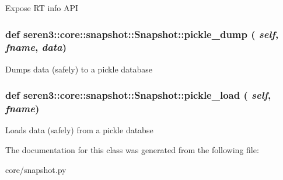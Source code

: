 \begin{DoxyVerb}
Expose RT info API
\end{DoxyVerb}
 \hypertarget{classseren3_1_1core_1_1snapshot_1_1Snapshot_a96b46c9c409bc85e6b6a9ba7fb1afb9b}{
\subsubsection[{pickle\_\-dump}]{\setlength{\rightskip}{0pt plus 5cm}def seren3::core::snapshot::Snapshot::pickle\_\-dump ( {\em self}, \/   {\em fname}, \/   {\em data})}}
\label{classseren3_1_1core_1_1snapshot_1_1Snapshot_a96b46c9c409bc85e6b6a9ba7fb1afb9b}
\begin{DoxyVerb}
Dumps data (safely) to a pickle database
\end{DoxyVerb}
 \hypertarget{classseren3_1_1core_1_1snapshot_1_1Snapshot_a50a31610499721188b20bdc07f35fdd9}{
\subsubsection[{pickle\_\-load}]{\setlength{\rightskip}{0pt plus 5cm}def seren3::core::snapshot::Snapshot::pickle\_\-load ( {\em self}, \/   {\em fname})}}
\label{classseren3_1_1core_1_1snapshot_1_1Snapshot_a50a31610499721188b20bdc07f35fdd9}
\begin{DoxyVerb}
Loads data (safely) from a pickle databse
\end{DoxyVerb}
 

The documentation for this class was generated from the following file:\begin{DoxyCompactItemize}
\item 
core/snapshot.py\end{DoxyCompactItemize}
